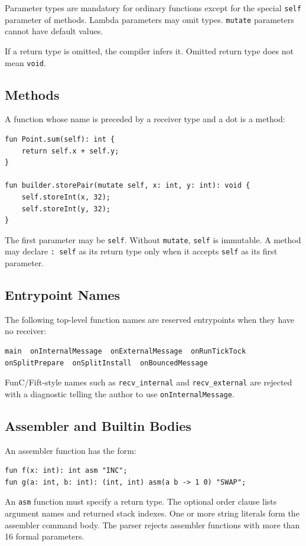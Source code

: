 \documentclass[12pt,oneside]{article}
\begin{document}
Parameter types are mandatory for ordinary functions except for the special
\verb|self| parameter of methods. Lambda parameters may omit types.
\verb|mutate| parameters cannot have default values.

If a return type is omitted, the compiler infers it. Omitted return type does
not mean \verb|void|.

\subsection{Methods}
A function whose name is preceded by a receiver type and a dot is a method:

\begin{verbatim}
fun Point.sum(self): int {
    return self.x + self.y;
}

fun builder.storePair(mutate self, x: int, y: int): void {
    self.storeInt(x, 32);
    self.storeInt(y, 32);
}
\end{verbatim}

The first parameter may be \verb|self|. Without \verb|mutate|, \verb|self| is
immutable. A method may declare \verb|: self| as its return type only when it
accepts \verb|self| as its first parameter.

\subsection{Entrypoint Names}
The following top-level function names are reserved entrypoints when they have
no receiver:

\begin{verbatim}
main  onInternalMessage  onExternalMessage  onRunTickTock
onSplitPrepare  onSplitInstall  onBouncedMessage
\end{verbatim}

FunC/Fift-style names such as \verb|recv_internal| and \verb|recv_external|
are rejected with a diagnostic telling the author to use
\verb|onInternalMessage|.

\subsection{Assembler and Builtin Bodies}
An assembler function has the form:

\begin{verbatim}
fun f(x: int): int asm "INC";
fun g(a: int, b: int): (int, int) asm(a b -> 1 0) "SWAP";
\end{verbatim}

An \verb|asm| function must specify a return type. The optional order clause
lists argument names and returned stack indexes. One or more string literals
form the assembler command body. The parser rejects assembler functions with
more than 16 formal parameters.
\end{document}
